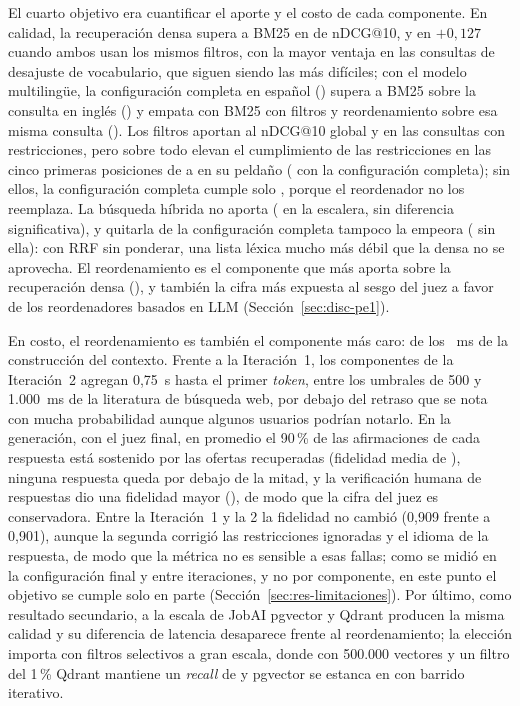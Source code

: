 El cuarto objetivo era cuantificar el aporte y el costo de cada componente. En calidad, la recuperación densa supera a BM25 en \cDifDensoBM{} de nDCG@10, y en $+0{,}127$ cuando ambos usan los mismos filtros, con la mayor ventaja en las consultas de desajuste de vocabulario, que siguen siendo las más difíciles; con el modelo multilingüe, la configuración completa en español (\cNdcgCompletaEs) supera a BM25 sobre la consulta en inglés (\cNdcgBMEnParalela) y empata con BM25 con filtros y reordenamiento sobre esa misma consulta (\cNdcgBMFiltrosReordEnParalela). Los filtros aportan \cDifFiltros{} al nDCG@10 global y \cDifFiltrosRestr{} en las consultas con restricciones, pero sobre todo elevan el cumplimiento de las restricciones en las cinco primeras posiciones de \cCumplDenso{} a \cCumplFiltros{} en su peldaño (\cCumplCompleta{} con la configuración completa); sin ellos, la configuración completa cumple solo \cCumplCompletaSinFiltros, porque el reordenador no los reemplaza. La búsqueda híbrida no aporta (\cDifHibrida{} en la escalera, sin diferencia significativa), y quitarla de la configuración completa tampoco la empeora (\cNdcgCompletaSinHibrida{} sin ella): con RRF sin ponderar, una lista léxica mucho más débil que la densa no se aprovecha. El reordenamiento es el componente que más aporta sobre la recuperación densa (\cDifReord), y también la cifra más expuesta al sesgo del juez a favor de los reordenadores basados en LLM (Sección~\ref{sec:disc-pe1}).

En costo, el reordenamiento es también el componente más caro: \cMsReord{} de los \cMsContexto~ms de la construcción del contexto. Frente a la Iteración~1, los componentes de la Iteración~2 agregan 0,75~s hasta el primer \textit{token}, entre los umbrales de 500 y 1.000~ms de la literatura de búsqueda web, por debajo del retraso que se nota con mucha probabilidad aunque algunos usuarios podrían notarlo. En la generación, con el juez final, en promedio el 90\,\% de las afirmaciones de cada respuesta está sostenido por las ofertas recuperadas (fidelidad media de \cFidelidad), ninguna respuesta queda por debajo de la mitad, y la verificación humana de \cRespuestasRevisadas{} respuestas dio una fidelidad mayor (\cFidelidadHumana), de modo que la cifra del juez es conservadora. Entre la Iteración~1 y la 2 la fidelidad no cambió (0,909 frente a 0,901), aunque la segunda corrigió las restricciones ignoradas y el idioma de la respuesta, de modo que la métrica no es sensible a esas fallas; como se midió en la configuración final y entre iteraciones, y no por componente, en este punto el objetivo se cumple solo en parte (Sección~\ref{sec:res-limitaciones}). Por último, como resultado secundario, a la escala de JobAI pgvector y Qdrant producen la misma calidad y su diferencia de latencia desaparece frente al reordenamiento; la elección importa con filtros selectivos a gran escala, donde con 500.000 vectores y un filtro del 1\,\% Qdrant mantiene un \textit{recall} de \cRecallQdrant{} y pgvector se estanca en \cRecallPgIterativo{} con barrido iterativo.

